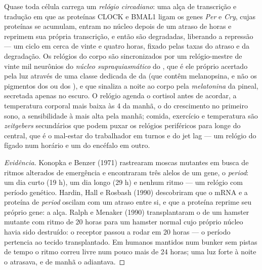 \begin{definition}\label{def:b3:endocrinology:clock}
Quase toda célula carrega um \emph{relógio circadiano}: uma alça de
transcrição e tradução em que as proteínas CLOCK e BMAL1 ligam os genes
\emph{Per} e \emph{Cry}, cujas proteínas se acumulam, entram no núcleo
depois de um atraso de horas e reprimem sua própria transcrição, e então
são degradadas, liberando a repressão --- um ciclo em cerca de vinte e
quatro horas, fixado pelas taxas do atraso e da degradação. Os relógios
do corpo são sincronizados por um relógio-mestre de vinte mil neurônios
do \emph{núcleo supraquiasmático} do , que é ele próprio
acertado pela luz através de uma classe dedicada de 
da  (que contêm melanopsina, e não os pigmentos dos  ou
dos ), e que sinaliza a noite ao corpo pela \emph{melatonina} da
pineal, secretada apenas no escuro. O relógio agenda o cortisol antes de
acordar, a temperatura corporal mais baixa às 4 da manhã, o  do
crescimento no primeiro sono, a sensibilidade à  mais alta pela
manhã; comida, exercício e temperatura são \emph{zeitgebers} secundários
que podem puxar os relógios periféricos para longe do central, que é o
mal-estar do trabalhador em turnos e do jet lag --- um relógio do fígado
num horário e um do encéfalo em outro.
\end{definition}

\begin{proof}[Evidência]
Konopka e Benzer (1971) rastrearam moscas mutantes em busca de ritmos
alterados de emergência e encontraram três alelos de um gene, o
\emph{period}: um dia curto (19 h), um dia longo (29 h) e nenhum ritmo
--- um relógio com período genético. Hardin, Hall e Rosbash (1990)
descobriram que o mRNA e a proteína de \emph{period} oscilam com um
atraso entre si, e que a proteína reprime seu próprio gene: a alça.
Ralph e Menaker (1990) transplantaram o  de um
hamster mutante com ritmo de 20 horas para um hamster normal cujo
próprio núcleo havia sido destruído: o receptor passou a rodar em 20
horas --- o período pertencia ao tecido transplantado. Em humanos
mantidos num bunker sem pistas de tempo o ritmo correu livre num pouco
mais de 24 horas; uma luz forte à noite o atrasava, e de manhã o
adiantava.
\end{proof}


